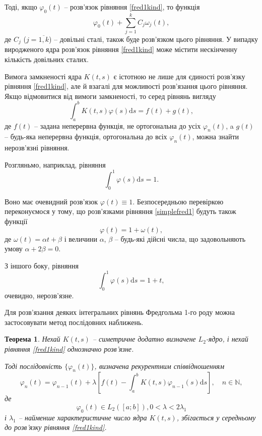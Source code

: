\documentclass[14pt,twoside]{extreport}
\theoremstyle{mystyle}
\newtheorem{thm}{Теорема}
\numberwithin{equation}{chapter}
\begin{document}
Тоді, якщо $\varphi_0(t)$ -- розв'язок рівняння \eqref{fred1kind}, то функція
\[
 \varphi_0(t) + \sum_{j=1}^{k} C_j \omega_j(t),
\]
де $C_j$ ($j = \overline{1, k}$) -- довільні сталі, також буде розв'язком цього рівняння. У випадку виродженого ядра розв'язок рівняння \eqref{fred1kind} може містити нескінченну кількість довільних сталих.

Вимога замкненості ядра $K(t, s)$ є істотною не лише для єдиності розв'язку рівняння \eqref{fred1kind}, але й взагалі для можливості розв'язання цього рівняння. Якщо відмовитися від вимоги замкненості, то серед рівнянь вигляду
\[
 \int_{a}^{b} K(t, s) \varphi(s) \mathrm{d}s = f(t) + g(t),
\]
де $f(t)$ -- задана неперервна функція, не ортогональна до усіх $\varphi_n(t)$, a $g(t)$ -- будь-яка неперервна функція, ортогональна до всіх $\varphi_n(t)$, можна знайти нерозв'язні рівняння.

Розгляньмо, наприклад, рівняння
\begin{equation}\label{simplefred1}
 \int_{0}^{1} \varphi(s) \mathrm{d}s = 1.
\end{equation}

Воно має очевидний розв'язок $\varphi(t) \equiv 1$. Безпосередньою перевіркою переконуємося у тому, що розв'язками рівняння \eqref{simplefred1} будуть також функції
\[
 \varphi(t) = 1 + \omega(t),
\]
де $\omega(t) = \alpha t + \beta$ і величини $\alpha$, $\beta$ -- будь-які дійсні числа, що задовольняють умову $\alpha + 2 \beta =0$.

З іншого боку, рівняння
\[
 \int_{0}^{1} \varphi(s) \mathrm{d}s = 1 + t,
\]
очевидно, нерозв'язне.

Для розв'язання деяких інтегральних рівнянь Фредгольма 1-го роду можна застосовувати метод послідовних наближень.
\begin{thm}
 Нехай $K(t, s)$ -- симетричне додатно визначене $L_2$-ядро, і нехай рівняння
 \eqref{fred1kind} однозначно розв'язне.

Тоді послідовність $\{\varphi_n(t)\}$, визначена рекурентним співвідношенням
\begin{equation}\label{iterfred1}
 \varphi_n(t) = \varphi_{n-1}(t) + \lambda \left[f(t) - \int_{a}^{b} K(t, s) \varphi_{n-1}(s) \mathrm{d}s \right], \quad n\in \mathbb{N},
\end{equation}
де
\begin{equation}
 \varphi_0(t) \in L_2([a; b]), 0<\lambda < 2 \lambda_1
\end{equation}
і $\lambda_1$ -- найменше характеристичне число ядра $K(t, s)$, збігається у середньому до розв'язку рівняння \eqref{fred1kind}.
\end{thm}
\end{document}
